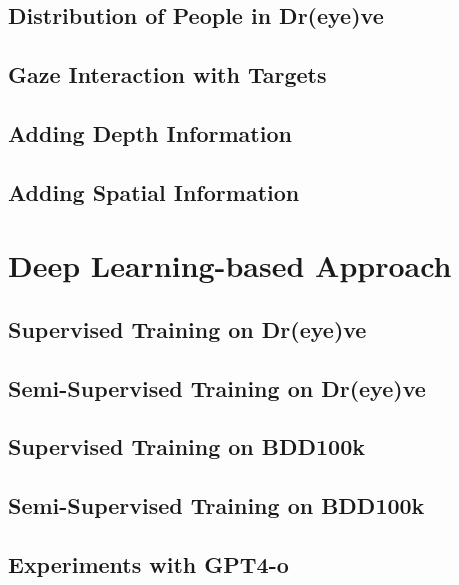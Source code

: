 \subsection{Distribution of People in Dr(eye)ve}
\subsection{Gaze Interaction with Targets}
\subsection{Adding Depth Information}
\subsection{Adding Spatial Information}


\section {Deep Learning-based Approach}
\subsection{Supervised Training on Dr(eye)ve}
\subsection{Semi-Supervised Training on Dr(eye)ve}
\subsection{Supervised Training on BDD100k}
\subsection{Semi-Supervised Training on BDD100k}
\subsection{Experiments with GPT4-o}